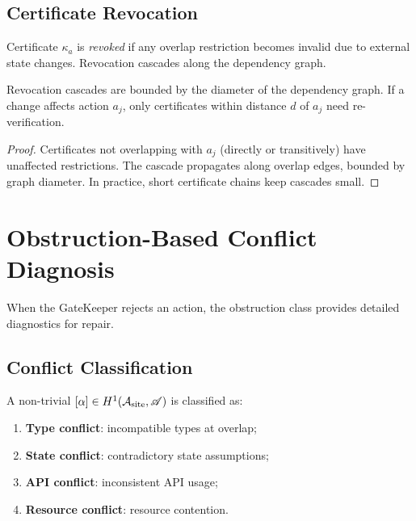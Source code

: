 \documentclass[11pt]{article}
\newcommand{\ActionSite}{\mathcal{A}_{\mathrm{site}}}
\newcommand{\ActionSheaf}{\mathscr{A}}
\begin{document}
\subsection{Certificate Revocation}\label{subsec:revocation}

\begin{definition}\label{def:revocation}
Certificate $\kappa_a$ is \emph{revoked} if any overlap restriction
becomes invalid due to external state changes.  Revocation cascades
along the dependency graph.
\end{definition}

\begin{proposition}\label{prop:revocation}
Revocation cascades are bounded by the diameter of the dependency
graph.  If a change affects action $a_j$, only certificates within
distance $d$ of $a_j$ need re-verification.
\end{proposition}

\begin{proof}
Certificates not overlapping with $a_j$ (directly or transitively)
have unaffected restrictions.  The cascade propagates along overlap
edges, bounded by graph diameter.  In practice, short certificate
chains keep cascades small.
\end{proof}


\section{Obstruction-Based Conflict Diagnosis}\label{sec:obstruction-repair}

When the GateKeeper rejects an action, the obstruction class provides
detailed diagnostics for repair.

\subsection{Conflict Classification}\label{subsec:conflict-class}

\begin{definition}\label{def:conflict-tax}
A non-trivial $[\alpha] \in \Hcoh{1}(\ActionSite, \ActionSheaf)$
is classified as:
\begin{enumerate}
  \item \textbf{Type conflict}: incompatible types at overlap;
  \item \textbf{State conflict}: contradictory state assumptions;
  \item \textbf{API conflict}: inconsistent API usage;
  \item \textbf{Resource conflict}: resource contention.
\end{enumerate}
\end{definition}
\end{document}
